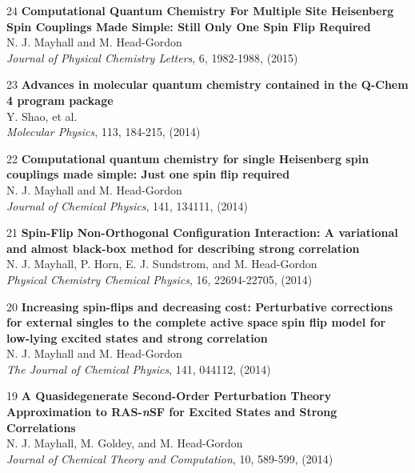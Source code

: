 \documentclass[10pt]{article}
\newenvironment{lonelist}[1][\enskip\textbullet]%
        {\vspace{-\baselineskip}\begin{list}{#1}{%
        \setlength{\partopsep}{0pt}%
        \setlength{\topsep}{0pt}}}
        {\end{list}\vspace{-.6\baselineskip}}
\def\Vhrulefill{\leavevmode\leaders\hrule height 0.7ex depth \dimexpr0.4pt-0.7ex\hfill\kern0pt}
\begin{document}
\begin{lonelist}
\item[24\hspace{4pt}] \textbf{Computational Quantum Chemistry For Multiple Site Heisenberg Spin Couplings Made Simple: Still Only One Spin Flip Required}\\
N. J. Mayhall and M. Head-Gordon\\
\textsl{Journal of Physical Chemistry Letters}, 6, 1982-1988, (2015)


\item[23\hspace{4pt}] \textbf{Advances in molecular quantum chemistry contained in the Q-Chem 4 program package}\\
Y. Shao, et al.\\
\textsl{Molecular Physics}, 113, 184-215, (2014)

\item[22\hspace{4pt}] \textbf{Computational quantum chemistry for single Heisenberg spin couplings made simple: Just one spin flip required}\\
N. J. Mayhall and M. Head-Gordon\\
\textsl{Journal of Chemical Physics}, 141, 134111, (2014)



%
\item[21\hspace{4pt}] \textbf{Spin-Flip Non-Orthogonal Configuration Interaction: A variational and almost black-box method for describing strong correlation}\\
N. J. Mayhall, P. Horn, E. J. Sundstrom, and M. Head-Gordon\\
\textsl{Physical Chemistry Chemical Physics}, 16, 22694-22705, (2014)


\item[20\hspace{4pt}] \textbf{Increasing spin-flips and decreasing cost: Perturbative corrections for external singles to the complete 
		active space spin flip model for low-lying excited states and strong correlation}\\
N. J. Mayhall and M. Head-Gordon\\
\textsl{The Journal of Chemical Physics}, 141, 044112, (2014)

\item[19\hspace{4pt}] \textbf{A Quasidegenerate Second-Order Perturbation Theory Approximation to RAS-\textsl{n}SF for Excited States and Strong Correlations}\\
N. J. Mayhall, M. Goldey, and M. Head-Gordon\\
\textsl{Journal of Chemical Theory and Computation}, 10, 589-599, (2014)


\end{lonelist}
\end{document}
